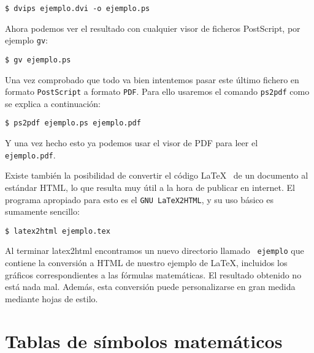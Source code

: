 \begin{verbatim}
$ dvips ejemplo.dvi -o ejemplo.ps
\end{verbatim}

Ahora  podemos  ver  el  resultado con  cualquier  visor  de  ficheros
PostScript, por ejemplo {\tt gv}:

\begin{verbatim}
$ gv ejemplo.ps
\end{verbatim}

Una  vez comprobado  que todo  va  bien intentemos  pasar este  último
fichero en  formato {\tt  PostScript} a formato  {\tt PDF}.  Para ello
usaremos el comando {\tt ps2pdf} como se explica a continuación:

\begin{verbatim}
$ ps2pdf ejemplo.ps ejemplo.pdf
\end{verbatim}

Y una vez hecho esto ya podemos usar el visor de PDF para leer el {\tt
ejemplo.pdf}.

Existe también  la posibilidad  de convertir el  código \LaTeX~  de un
documento  al estándar  HTML, lo  que resulta  muy útil  a la  hora de
publicar en internet.  El programa apropiado para esto es  el {\tt GNU
LaTeX2HTML}, y su uso básico es sumamente sencillo:

\begin{verbatim}
$ latex2html ejemplo.tex
\end{verbatim}

Al terminar  latex2html encontramos  un nuevo directorio  llamado {\tt
ejemplo}  que  contiene  la  conversión  a  HTML  de  nuestro  ejemplo
de  \LaTeX, incluidos  los  gráficos correspondientes  a las  fórmulas
matemáticas.  El resultado  obtenido no  está nada  mal. Además,  esta
conversión  puede  personalizarse en  gran  medida  mediante hojas  de
estilo.


\section{Tablas de símbolos matemáticos}

